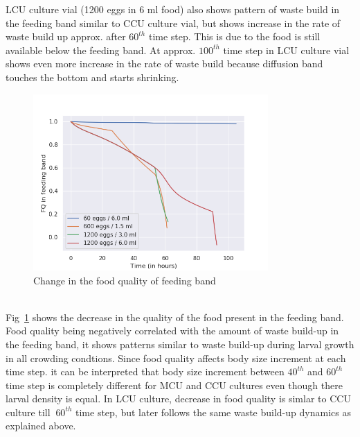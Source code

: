 LCU culture vial (1200 eggs in 6 ml food) also shows pattern of waste build in the feeding band similar to CCU culture vial, but shows increase in the rate of waste build up approx. after $60^{th}$ time step. This is due to the food is still available below the feeding band. At approx. $100^{th}$ time step in LCU culture vial shows even more increase in the rate of waste build because diffusion band touches the bottom and starts shrinking.
\begin{figure}[h]
  \centering
  \includegraphics[width=0.8\textwidth]{C2/Figs/fQ}
  \caption{Change in the food quality of feeding band}
  \label{fig:fQ}
\end{figure}\\
Fig~\ref{fig:fQ} shows the decrease in the quality of the food present in the feeding band. Food quality being negatively correlated with the amount of waste build-up in the feeding band, it shows patterns similar to waste build-up during larval growth in all crowding condtions. Since food quality affects body size increment at each time step. it can be interpreted that body size increment between $40^{th}$ and $60^{th}$ time step is completely different for MCU and CCU cultures even though there larval density is equal. In LCU culture, decrease in food quality is simlar to CCU culture till $~60^{th}$ time step, but later follows the same waste build-up dynamics as explained above.
\pagebreak
